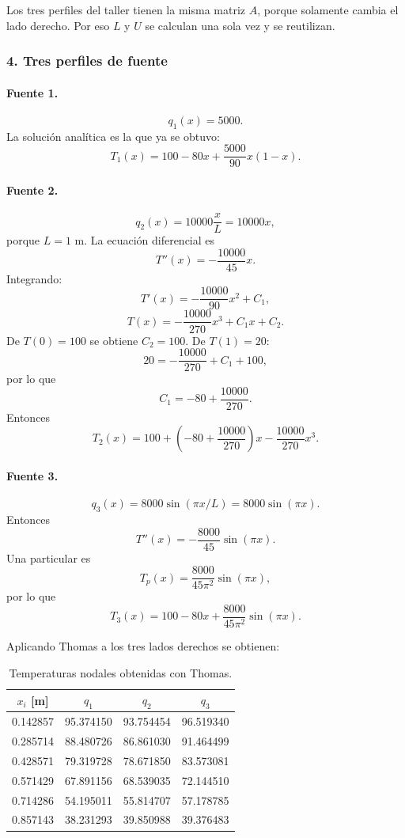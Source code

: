 \documentclass[11pt,a4paper]{article}
\begin{document}
Los tres perfiles del taller tienen la misma matriz $A$, porque solamente cambia el lado derecho. Por eso $L$ y $U$ se calculan una sola vez y se reutilizan.

\subsubsection*{4. Tres perfiles de fuente}

\paragraph{Fuente 1.}
\[
q_1(x)=5000.
\]
La solución analítica es la que ya se obtuvo:
\[
T_1(x)=100-80x+\frac{5000}{90}x(1-x).
\]

\paragraph{Fuente 2.}
\[
q_2(x)=10000\frac{x}{L}=10000x,
\]
porque $L=1$ m. La ecuación diferencial es
\[
T''(x)=-\frac{10000}{45}x.
\]
Integrando:
\[
T'(x)=-\frac{10000}{90}x^2+C_1,
\]
\[
T(x)=-\frac{10000}{270}x^3+C_1x+C_2.
\]
De $T(0)=100$ se obtiene $C_2=100$. De $T(1)=20$:
\[
20=-\frac{10000}{270}+C_1+100,
\]
por lo que
\[
C_1=-80+\frac{10000}{270}.
\]
Entonces
\begin{equation}
\boxed{T_2(x)=100+\left(-80+\frac{10000}{270}\right)x-\frac{10000}{270}x^3.}
\end{equation}

\paragraph{Fuente 3.}
\[
q_3(x)=8000\sin(\pi x/L)=8000\sin(\pi x).
\]
Entonces
\[
T''(x)=-\frac{8000}{45}\sin(\pi x).
\]
Una particular es
\[
T_p(x)=\frac{8000}{45\pi^2}\sin(\pi x),
\]
por lo que
\begin{equation}
\boxed{T_3(x)=100-80x+\frac{8000}{45\pi^2}\sin(\pi x).}
\end{equation}

Aplicando Thomas a los tres lados derechos se obtienen:
\begin{table}[H]
\centering
\caption{Temperaturas nodales obtenidas con Thomas.}
\begin{tabular}{c|ccc}
\toprule
$x_i$ [m] & $q_1$ & $q_2$ & $q_3$ \\
\midrule
0.142857 & 95.374150 & 93.754454 & 96.519340\\
0.285714 & 88.480726 & 86.861030 & 91.464499\\
0.428571 & 79.319728 & 78.671850 & 83.573081\\
0.571429 & 67.891156 & 68.539035 & 72.144510\\
0.714286 & 54.195011 & 55.814707 & 57.178785\\
0.857143 & 38.231293 & 39.850988 & 39.376483\\
\bottomrule
\end{tabular}
\end{table}
\end{document}
